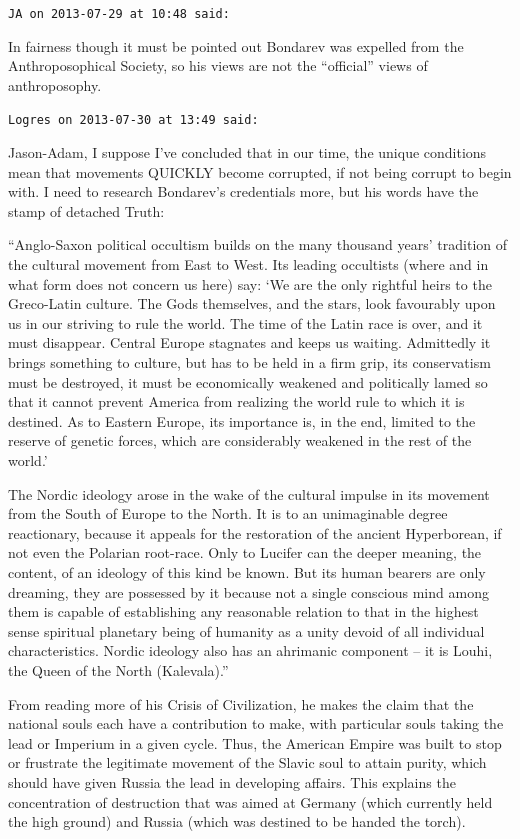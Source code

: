 \begin{footnotesize}
\begin{sffamily}
\hfill

\texttt{JA on 2013-07-29 at 10:48 said:}

In fairness though it must be pointed out Bondarev was expelled from the Anthroposophical Society, so his views are not the ``official'' views of anthroposophy.

\hfill

\texttt{Logres on 2013-07-30 at 13:49 said:}

Jason-Adam, I suppose I've concluded that in our time, the unique conditions mean that movements QUICKLY become corrupted, if not being corrupt to begin with. I need to research Bondarev's credentials more, but his words have the stamp of detached Truth:

``Anglo-Saxon political occultism builds on the many thousand years' tradition of the cultural movement from East to West. Its leading occultists (where and in what form does not concern us here) say: `We are the only rightful heirs to the Greco-Latin culture. The Gods themselves, and the stars, look favourably upon us in our striving to rule the world. The time of the Latin race is over, and it must disappear. Central Europe stagnates and keeps us waiting. Admittedly it brings something to culture, but has to be held in a firm grip, its conservatism must be destroyed, it must be economically weakened and politically lamed so that it cannot prevent America from realizing the world rule to which it is destined. As to Eastern Europe, its importance is, in the end, limited to the reserve of genetic forces, which are considerably weakened in the rest of the world.'

The Nordic ideology arose in the wake of the cultural impulse in its movement from the South of Europe to the North. It is to an unimaginable degree reactionary, because it appeals for the restoration of the ancient Hyperborean, if not even the Polarian root-race. Only to Lucifer can the deeper meaning, the content, of an ideology of this kind be known. But its human bearers are only dreaming, they are possessed by it because not a single conscious mind among them is capable of establishing any reasonable relation to that in the highest sense spiritual planetary being of humanity as a unity devoid of all individual characteristics. Nordic ideology also has an ahrimanic component -- it is Louhi, the Queen of the North (Kalevala).''

From reading more of his Crisis of Civilization, he makes the claim that the national souls each have a contribution to make, with particular souls taking the lead or Imperium in a given cycle. Thus, the American Empire was built to stop or frustrate the legitimate movement of the Slavic soul to attain purity, which should have given Russia the lead in developing affairs. This explains the concentration of destruction that was aimed at Germany (which currently held the high ground) and Russia (which was destined to be handed the torch).


\end{sffamily}
\end{footnotesize}
